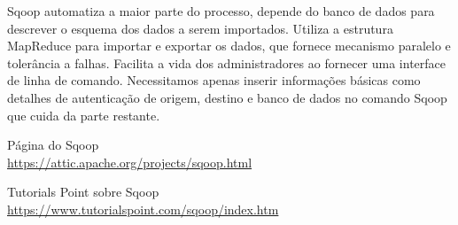 \documentclass[a4paper,11pt]{article}
\begin{document}
Sqoop automatiza a maior parte do processo, depende do banco de dados para descrever o esquema dos dados a serem importados. Utiliza a estrutura MapReduce para importar e exportar os dados, que fornece mecanismo paralelo e tolerância a falhas. Facilita a vida dos administradores ao fornecer uma interface de linha de comando. Necessitamos apenas inserir informações básicas como detalhes de autenticação de origem, destino e banco de dados no comando Sqoop que cuida da parte restante. 



\begin{thebibliography}{4}
	Página do Sqoop \\
	\url{https://attic.apache.org/projects/sqoop.html}

	Tutorials Point sobre Sqoop \\
	\url{https://www.tutorialspoint.com/sqoop/index.htm}
	
	
\end{thebibliography}
\end{document}
